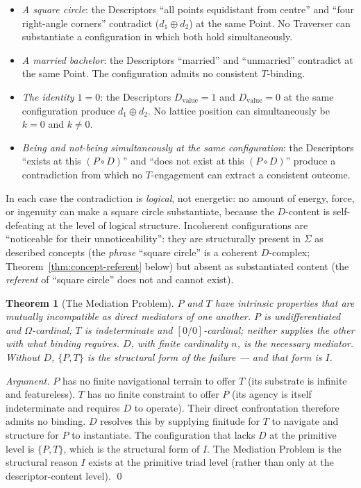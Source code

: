 \documentclass[11pt,a4paper]{article}
\newtheorem{theorem}{Theorem}[section]
\theoremstyle{definition}
\theoremstyle{remark}
\begin{document}
\begin{itemize}[leftmargin=*]
\item \emph{A square circle}: the Descriptors ``all points equidistant from centre'' and ``four right-angle corners'' contradict ($d_{1} \oplus d_{2}$) at the same Point. No Traverser can substantiate a configuration in which both hold simultaneously.
\item \emph{A married bachelor}: the Descriptors ``married'' and ``unmarried'' contradict at the same Point. The configuration admits no consistent $T$-binding.
\item \emph{The identity $1 = 0$}: the Descriptors $D_{\mathrm{value}} = 1$ and $D_{\mathrm{value}} = 0$ at the same configuration produce $d_{1} \oplus d_{2}$. No lattice position can simultaneously be $k = 0$ and $k \neq 0$.
\item \emph{Being and not-being simultaneously at the same configuration}: the Descriptors ``exists at this $(P \circ D)$'' and ``does not exist at this $(P \circ D)$'' produce a contradiction from which no $T$-engagement can extract a consistent outcome.
\end{itemize}

In each case the contradiction is \emph{logical}, not energetic: no amount of energy, force, or ingenuity can make a square circle substantiate, because the $D$-content is self-defeating at the level of logical structure. Incoherent configurations are ``noticeable for their unnoticeability'': they are structurally present in $\Sigma$ as described concepts (the \emph{phrase} ``square circle'' is a coherent $D$-complex; Theorem~\ref{thm:concept-referent} below) but absent as substantiated content (the \emph{referent} of ``square circle'' does not and cannot exist).

\begin{theorem}[The Mediation Problem]\label{thm:mediation-problem}
$P$ and $T$ have intrinsic properties that are mutually incompatible as direct mediators of one another. $P$ is undifferentiated and $\Omega$-cardinal; $T$ is indeterminate and $[0/0]$-cardinal; neither supplies the other with what binding requires. $D$, with finite cardinality $n$, is the necessary mediator. Without $D$, $\{P,T\}$ is the structural form of the failure --- and that form is $I$.
\end{theorem}

\begin{proof}[Argument]
$P$ has no finite navigational terrain to offer $T$ (its substrate is infinite and featureless). $T$ has no finite constraint to offer $P$ (its agency is itself indeterminate and requires $D$ to operate). Their direct confrontation therefore admits no binding. $D$ resolves this by supplying finitude for $T$ to navigate and structure for $P$ to instantiate. The configuration that lacks $D$ at the primitive level is $\{P,T\}$, which is the structural form of $I$. The Mediation Problem is the structural reason $I$ exists at the primitive triad level (rather than only at the descriptor-content level). \qed
\end{proof}
\end{document}

